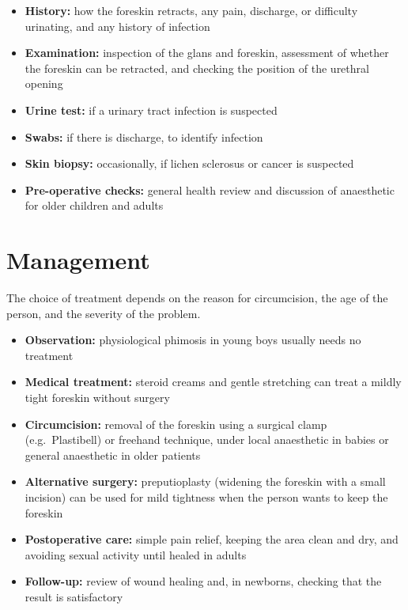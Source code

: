 \begin{itemize}
    \item \textbf{History:} how the foreskin retracts, any pain, discharge, or difficulty urinating, and any history of infection
    \item \textbf{Examination:} inspection of the glans and foreskin, assessment of whether the foreskin can be retracted, and checking the position of the urethral opening
    \item \textbf{Urine test:} if a urinary tract infection is suspected
    \item \textbf{Swabs:} if there is discharge, to identify infection
    \item \textbf{Skin biopsy:} occasionally, if lichen sclerosus or cancer is suspected
    \item \textbf{Pre-operative checks:} general health review and discussion of anaesthetic for older children and adults
\end{itemize}

\section*{Management}
The choice of treatment depends on the reason for circumcision, the age of the person, and the severity of the problem.

\begin{itemize}
    \item \textbf{Observation:} physiological phimosis in young boys usually needs no treatment
    \item \textbf{Medical treatment:} steroid creams and gentle stretching can treat a mildly tight foreskin without surgery
    \item \textbf{Circumcision:} removal of the foreskin using a surgical clamp (e.g.\ Plastibell) or freehand technique, under local anaesthetic in babies or general anaesthetic in older patients
    \item \textbf{Alternative surgery:} preputioplasty (widening the foreskin with a small incision) can be used for mild tightness when the person wants to keep the foreskin
    \item \textbf{Postoperative care:} simple pain relief, keeping the area clean and dry, and avoiding sexual activity until healed in adults
    \item \textbf{Follow-up:} review of wound healing and, in newborns, checking that the result is satisfactory
\end{itemize}

